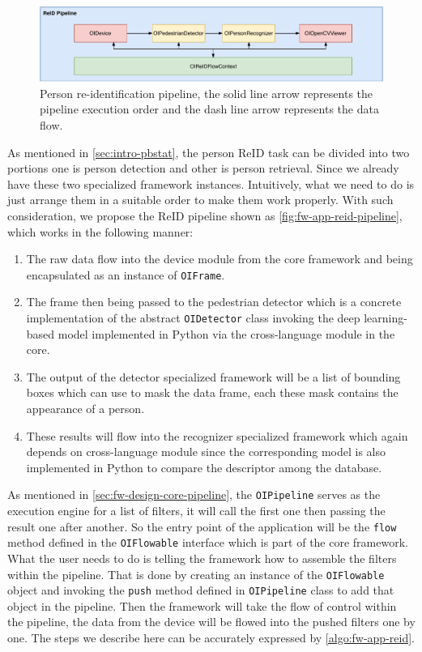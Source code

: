 \begin{figure}
    \centering
    \includegraphics[width=\linewidth]{figures/framework_app_reid_pipeline.pdf}
    \caption[Person re-identification pipeline]
    {Person re-identification pipeline,  the solid line arrow represents
    the pipeline execution order and the dash line arrow represents the
    data flow.}
    \label{fig:fw-app-reid-pipeline}
\end{figure}

As mentioned in \autoref{sec:intro-pbstat}, the person ReID task can be divided
into two portions one is person detection and other is person retrieval. Since
we already have these two specialized framework instances. Intuitively, what we
need to do is just arrange them in a suitable order to make them work properly.
With such consideration, we propose the ReID pipeline shown as
\autoref{fig:fw-app-reid-pipeline}, which works in the following manner:

\begin{enumerate}
    \item The raw data flow into the device module from the core framework and
    being encapsulated as an instance of \texttt{OIFrame}.
    \item The frame then being passed to the pedestrian detector which is a
    concrete implementation of the abstract \texttt{OIDetector} class invoking
    the deep learning-based model implemented in Python via the cross-language
    module in the core.
    \item The output of the detector specialized framework will be a list of
    bounding boxes which can use to mask the data frame, each these mask
    contains the appearance of a person.
    \item These results will flow into the recognizer specialized framework
    which again depends on cross-language module since the corresponding
    model is also implemented in Python to compare the descriptor among the
    database.
\end{enumerate}

As mentioned in \autoref{sec:fw-design-core-pipeline}, the \texttt{OIPipeline}
serves as the execution engine for a list of filters, it will call the first
one then passing the result one after another. So the entry point of the
application will be the \texttt{flow} method defined in the \texttt{OIFlowable}
interface which is part of the core framework. What the user needs to do is
telling the framework how to assemble the filters within the pipeline. That is
done by creating an instance of the \texttt{OIFlowable} object and invoking the
\texttt{push} method defined in \texttt{OIPipeline} class to add that object in
the pipeline.
Then the framework will take the flow of control within the pipeline, the data
from the device will be flowed into the pushed filters one by one.
The steps we describe here can be accurately expressed by
\autoref{algo:fw-app-reid}.

